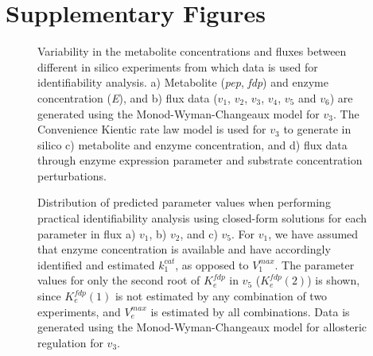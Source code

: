\documentclass[10pt]{article}
\begin{document}
\section{Supplementary Figures}	
\begin{figure}[!tbhp]
	\caption{Variability in the metabolite concentrations and fluxes between different in silico experiments from which data is used for identifiability analysis. a) Metabolite (\textit{pep}, \textit{fdp}) and enzyme concentration (\textit{E}), and b) flux data ($v_1$, $v_2$, $v_3$, $v_4$, $v_5$ and $v_6$) are generated using the Monod-Wyman-Changeaux model for $v_3$. The Convenience Kientic rate law model is used for $v_3$ to generate in silico c) metabolite and enzyme concentration, and d) flux data through enzyme expression parameter and substrate concentration perturbations.}\label{fig:experimental_data_dist}
\end{figure}	

\begin{figure}[!tbhp]
	\caption{Distribution of predicted parameter values when performing practical identifiability analysis using closed-form solutions for each parameter in flux a) $v_1$, b) $v_2$, and c) $v_5$. For $v_1$, we have assumed that enzyme concentration is available and have accordingly identified and estimated $k_1^{cat}$, as opposed to $V_1^{max}$. The parameter values for only the second root of $K_e^{fdp}$ in $v_5$ ($K_e^{fdp}(2)$) is shown, since $K_e^{fdp}(1)$ is not estimated by any combination of two experiments, and $V_e^{max}$ is estimated by all combinations. Data is generated using the Monod-Wyman-Changeaux model for allosteric regulation for $v_3$.}\label{fig:parameter_value_proof}
\end{figure}	
\end{document}
